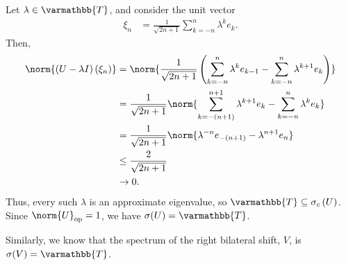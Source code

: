 \documentclass[10pt]{mypackage}
\renewcommand*{\mathbb}[1]{\varmathbb{#1}}
\begin{document}
\begin{example}
  Let $\lambda\in \mathbb{T}$, and consider the unit vector
  \begin{align*}
    \xi_n &= \frac{1}{\sqrt{2n+1}}\sum_{k=-n}^{n}\lambda^ke_k.
  \end{align*}
  Then,
  \begin{align*}
    \norm{\left(U - \lambda I\right)\left(\xi_n\right)} &= \norm{\frac{1}{\sqrt{2n+1}}\left(\sum_{k=-n}^{n}\lambda^ke_{k-1} - \sum_{k=-n}^{n}\lambda^{k+1}e_k\right)}\\
                                                        &= \frac{1}{\sqrt{2n+1}} \norm{\sum_{k=-\left(n+1\right)}^{n+1} \lambda^{k+1}e_k - \sum_{k=-n}^{n}\lambda^{k}e_k}\\
                                                        &= \frac{1}{\sqrt{2n+1}}\norm{\lambda^{-n}e_{-\left(n+1\right)}- \lambda^{n+1}e_n}\\
                                                        &\leq \frac{2}{\sqrt{2n+1}}\\
                                                        &\rightarrow 0.
  \end{align*}
  Thus, every such $\lambda$ is an approximate eigenvalue, so $\mathbb{T}\subseteq \sigma_c\left(U\right)$. Since $\norm{U}_{\text{op}} = 1$, we have $\sigma(U) = \mathbb{T}$.\newline

  Similarly, we know that the spectrum of the right bilateral shift, $V$, is $\sigma(V) = \mathbb{T}$.
\end{example}
\end{document}
